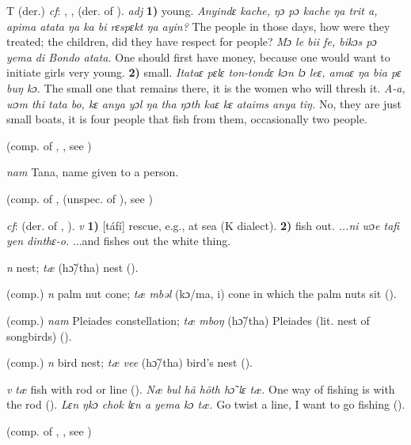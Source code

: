 \begin{letter}{T}
 (der.) \textit{cf}: , ,  (der. of ). \textit{adj} \textbf{1)} young. \textit{Anyindɛ kache, ŋɔ pɔ kache ŋa trit a, apima atata ŋa ka bi rɛspɛkt ŋa ayin?} The people in those days, how were they treated; the children, did they have respect for people? \textit{Mɔ le bii fe, bikɔs pɔ yema di Bondo atata.} One should first have money, because one would want to initiate girls very young. \textbf{2)} small. \textit{Itataɛ pɛlɛ ton-tondɛ kɔn lɔ leɛ, amaɛ ŋa bia pɛ buŋ kɔ.} The small one that remains there, it is the women who will thresh it. \textit{A-a, wɔm thi tata bo, kɛ anya yɔl ŋa tha ŋɔth kaɛ kɛ ataims anya tiŋ.} No, they are just small boats, it is four people that fish from them, occasionally two people.

 (comp. of , , see ) 

 \textit{nam} Tana, name given to a person. 

 (comp. of ,  (unspec. of ), see ) 

 \textit{cf}:  (der. of , ). \textit{v} \textbf{1)} [táfí] rescue, e.g., at sea (K dialect). \textbf{2)} fish out. \textit{...ni wɔe tafi yen dinthɛ-o.} ...and fishes out the white thing.

 \textit{n} nest; \textit{tæ} (hɔ̃/tha) nest (\citealt{Pichl1967}). 

 (comp.) \textit{n} palm nut cone; \textit{tæ mbəl} (kɔ/ma, i) cone in which the palm nuts sit (\citealt{Pichl1967}). 

 (comp.) \textit{nam} Pleiades constellation; \textit{tæ mboŋ} (hɔ̃/tha) Pleiades (lit. nest of songbirds) (\citealt{Pichl1967}). 

 (comp.) \textit{n} bird nest; \textit{tæ vee} (hɔ̃/tha) bird's nest (\citealt{Pichl1967}). 

 \textit{v} \textit{tæ} fish with rod or line (\citealt{Pichl1967}). \textit{Næ bul hã hõth hɔ̃ lɛ tæ.} One way of fishing is with the rod (\citealt{Pichl1967}). \textit{Lɛn ŋkɔ chok lɛn a yema kɔ tæ.} Go twist a line, I want to go fishing (\citealt{Pichl1967}). 

 (comp. of , , see )


\end{letter}
